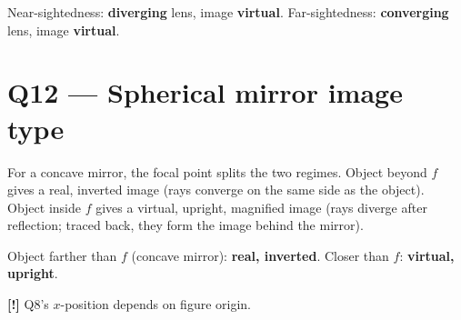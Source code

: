 \documentclass[11pt]{article}
\newcommand{\warn}{\textbf{[!]}}
\begin{document}
Near-sightedness: \textbf{diverging} lens, image \textbf{virtual}. Far-sightedness: \textbf{converging} lens, image \textbf{virtual}.

\section*{Q12 --- Spherical mirror image type}
For a concave mirror, the focal point splits the two regimes. Object beyond $f$ gives a real, inverted image (rays converge on the same side as the object). Object inside $f$ gives a virtual, upright, magnified image (rays diverge after reflection; traced back, they form the image behind the mirror).

Object farther than $f$ (concave mirror): \textbf{real, inverted}. Closer than $f$: \textbf{virtual, upright}.

\bigskip\warn{} Q8's $x$-position depends on figure origin.
\end{document}
